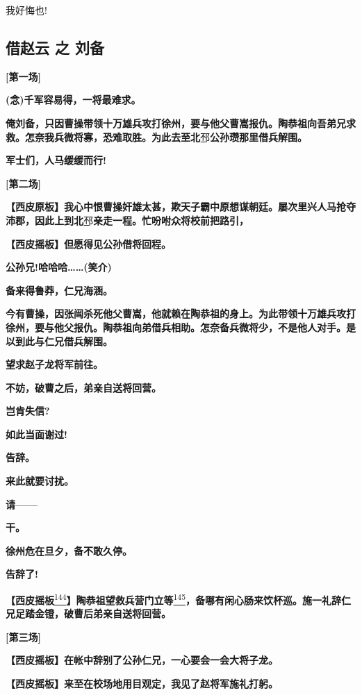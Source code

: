 我好悔也!

\hypertarget{ux501fux8d75ux4e91-ux4e4b-ux5218ux5907}{%
\subsection{借赵云 之
刘备}\label{ux501fux8d75ux4e91-ux4e4b-ux5218ux5907}}

\textbf{{[}第一场{]}}

\textbf{(念)千军容易得，一将最难求。}

\textbf{俺刘备，只因曹操带领十万雄兵攻打徐州，要与他父曹嵩报仇。陶恭祖向吾弟兄求救。怎奈我兵微将寡，恐难取胜。为此去至北}邳\textbf{公孙瓒那里借兵解围。}

\textbf{军士们，人马缓缓而行!}

\textbf{{[}第二场{]}}

\textbf{【西皮原板】我心中恨曹操奸雄太甚，欺天子霸中原想谋朝廷。屡次里兴人马抢夺沛郡，因此上到北}邳\textbf{亲走一程。忙吩咐众将校前把路引，}

\textbf{【西皮摇板】但愿得见公孙借将回程。}

\textbf{公孙兄!哈哈哈\ldots{}\ldots{}(笑介)}

\textbf{备来得鲁莽，仁兄海涵。}

\textbf{今有曹操，因张闿杀死他父曹嵩，他就赖在陶恭祖的身上。为此带领十万雄兵攻打徐州，要与他父报仇。陶恭祖向弟借兵相助。怎奈备兵微将少，不是他人对手。是以到此与仁兄借兵解围。}

\textbf{望求赵子龙将军前往。}

\textbf{不妨，破曹之后，弟亲自送将回营。}

\textbf{岂肯失信?}

\textbf{如此当面谢过!}

\textbf{告辞。}

\textbf{来此就要讨扰。}

\textbf{请------}

\textbf{干。}

\textbf{徐州危在旦夕，备不敢久停。}

\textbf{告辞了!}

\textbf{【西皮摇板}\protect\hyperlink{fn144}{\textsuperscript{144}}\textbf{】陶恭祖望救兵营门立等}\protect\hyperlink{fn145}{\textsuperscript{145}}\textbf{，备哪有闲心肠来饮杯巡。施一礼辞仁兄足踏金镫，破曹后弟亲自送将回营。}

\textbf{{[}第三场{]}}

\textbf{【西皮摇板】在帐中辞别了公孙仁兄，一心要会一会大将子龙。}

\textbf{【西皮摇板】来至在校场地用目观定，我见了赵将军施礼打躬。}

